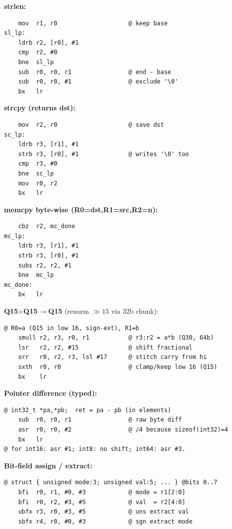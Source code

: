 \textbf{strlen:}
\begin{lstlisting}
    mov  r1, r0                    @ keep base
sl_lp:
    ldrb r2, [r0], #1
    cmp  r2, #0
    bne  sl_lp
    sub  r0, r0, r1                @ end - base
    sub  r0, r0, #1                @ exclude '\0'
    bx   lr
\end{lstlisting}

\textbf{strcpy (returns dst):}
\begin{lstlisting}
    mov  r2, r0                    @ save dst
sc_lp:
    ldrb r3, [r1], #1
    strb r3, [r0], #1              @ writes '\0' too
    cmp  r3, #0
    bne  sc_lp
    mov  r0, r2
    bx   lr
\end{lstlisting}

\textbf{memcpy byte-wise (R0=dst,R1=src,R2=n):}
\begin{lstlisting}
    cbz  r2, mc_done
mc_lp:
    ldrb r3, [r1], #1
    strb r3, [r0], #1
    subs r2, r2, #1
    bne  mc_lp
mc_done:
    bx   lr
\end{lstlisting}

\textbf{Q15$\times$Q15$\to$Q15} (renorm $\gg 15$ via 32b chunk):
\begin{lstlisting}
@ R0=a (Q15 in low 16, sign-ext), R1=b
    smull r2, r3, r0, r1           @ r3:r2 = a*b (Q30, 64b)
    lsr   r2, r2, #15              @ shift fractional
    orr   r0, r2, r3, lsl #17      @ stitch carry from hi
    sxth  r0, r0                   @ clamp/keep low 16 (Q15)
    bx    lr
\end{lstlisting}

\textbf{Pointer difference (typed):}
\begin{lstlisting}
@ int32_t *pa,*pb;  ret = pa - pb (in elements)
    sub  r0, r0, r1                @ raw byte diff
    asr  r0, r0, #2                @ /4 because sizeof(int32)=4
    bx   lr
@ for int16: asr #1; int8: no shift; int64: asr #3.
\end{lstlisting}

\textbf{Bit-field assign / extract:}
\begin{lstlisting}
@ struct { unsigned mode:3; unsigned val:5; ... } @bits 0..7
    bfi  r0, r1, #0, #3            @ mode = r1[2:0]
    bfi  r0, r2, #3, #5            @ val  = r2[4:0]
    ubfx r3, r0, #3, #5            @ uns extract val
    sbfx r4, r0, #0, #3            @ sgn extract mode
\end{lstlisting}

